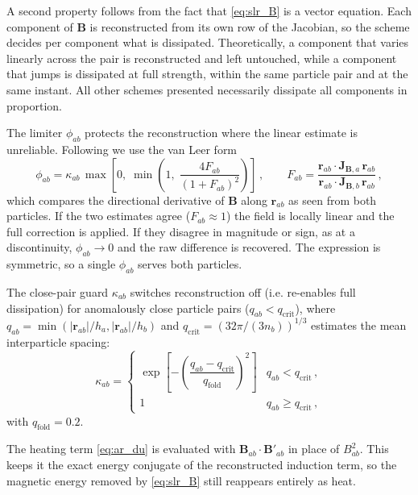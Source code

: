 A second property follows from the fact that \eqref{eq:slr_B} is a vector equation. Each component of $\mathbf{B}$ is reconstructed from its own row of the Jacobian, so the scheme decides per component what is dissipated. Theoretically, a component that varies linearly across the pair is reconstructed and left untouched, while a component that jumps is dissipated at full strength, within the same particle pair and at the same instant. All other schemes presented necessarily dissipate all components in proportion.

The limiter $\phi_{ab}$ protects the reconstruction where the linear estimate is unreliable. Following \cite{GarciaSenzCabezon2026, Frontiere2017} we use the van Leer form
\begin{equation}
    \phi_{ab} = \kappa_{ab}\, \max\!\left[0,\; \min\!\left(1,\; \frac{4 F_{ab}}{(1 + F_{ab})^2}\right)\right]\,, \qquad
    F_{ab} = \frac{\mathbf{r}_{ab} \cdot \mathbf{J}_{\mathbf{B},a}\, \mathbf{r}_{ab}}{\mathbf{r}_{ab} \cdot \mathbf{J}_{\mathbf{B},b}\, \mathbf{r}_{ab}}\,,
    \label{eq:vanleer}
\end{equation}
which compares the directional derivative of $\mathbf{B}$ along $\mathbf{r}_{ab}$ as seen from both particles. If the two estimates agree ($F_{ab} \approx 1$) the field is locally linear and the full correction is applied. If they disagree in magnitude or sign, as at a discontinuity, $\phi_{ab} \to 0$ and the raw difference is recovered. The expression is symmetric, so a single $\phi_{ab}$ serves both particles.

The close-pair guard $\kappa_{ab}$ \cite{Frontiere2017} switches reconstruction off (i.e. re-enables full dissipation) for anomalously close particle pairs ($q_{ab} < q_\mathrm{crit}$), where $q_{ab} = \min(|\mathbf{r}_{ab}|/h_a, |\mathbf{r}_{ab}|/h_b)$ and $q_\mathrm{crit} = (32\pi/(3 n_b))^{1/3}$ estimates the mean interparticle spacing:
\begin{equation}
    \kappa_{ab} = \begin{cases}
        \exp\!\left[-\left(\dfrac{q_{ab} - q_\mathrm{crit}}{q_\mathrm{fold}}\right)^{\!2}\right] & q_{ab} < q_\mathrm{crit}\,, \\
        1 & q_{ab} \geq q_\mathrm{crit}\,,
    \end{cases}
    \label{eq:kappa}
\end{equation}
with $q_\mathrm{fold} = 0.2$.

The heating term \eqref{eq:ar_du} is evaluated with $\mathbf{B}_{ab} \cdot \mathbf{B}'_{ab}$ in place of $B_{ab}^2$. This keeps it the exact energy conjugate of the reconstructed induction term, so the magnetic energy removed by \eqref{eq:slr_B} still reappears entirely as heat.

